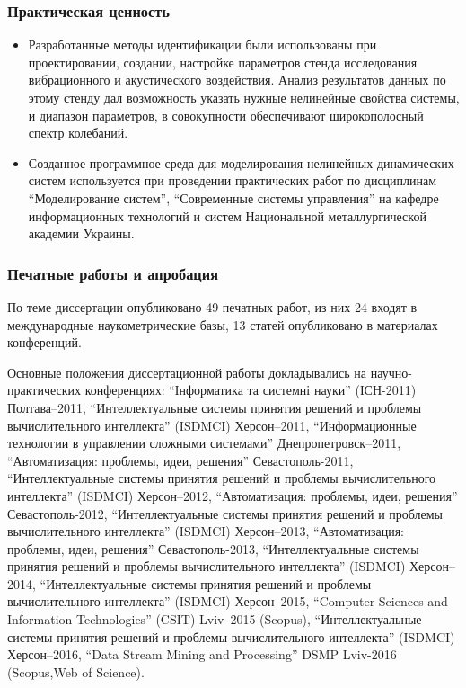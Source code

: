 \documentclass[10pt,utf8]{beamer}
\begin{document}

\begin{frame}
  \frametitle{Практическая ценность}

  \begin{itemize}

    \item
      Разработанные методы идентификации были использованы при проектировании,
      создании, настройке параметров стенда исследования вибрационного и
      акустического воздействия. Анализ результатов данных по этому стенду дал
      возможность указать нужные нелинейные свойства системы, и диапазон параметров,
      в совокупности обеспечивают широкополосный спектр колебаний.

    \item
      Созданное программное среда для моделирования нелинейных динамических систем
      используется при проведении практических работ по дисциплинам
      ``Моделирование систем'', ``Современные системы управления''
      на кафедре информационных технологий
      и систем Национальной металлургической академии Украины.

  \end{itemize}


\end{frame}




\begin{frame}
  \frametitle{Печатные работы и апробация}

По теме диссертации опубликовано
49 печатных работ,
из них
24 входят в международные наукометрические базы,
13 статей опубликовано в материалах конференций.

{\scriptsize
Основные положения диссертационной работы докладывались на
научно-практических конференциях:
``Інформатика та системні науки'' (ІСН-2011) Полтава--2011,
``Интеллектуальные системы принятия решений и проблемы вычислительного интеллекта'' (ISDMCI) Херсон--2011,
``Информационные технологии в управлении сложными системами'' Днепропетровск--2011,
``Автоматизация: проблемы, идеи, решения'' Севастополь-2011,
``Интеллектуальные системы принятия решений и проблемы вычислительного интеллекта'' (ISDMCI) Херсон--2012,
``Автоматизация: проблемы, идеи, решения'' Севастополь-2012,
``Интеллектуальные системы принятия решений и проблемы вычислительного интеллекта'' (ISDMCI) Херсон--2013,
``Автоматизация: проблемы, идеи, решения'' Севастополь-2013,
``Интеллектуальные системы принятия решений и проблемы вычислительного интеллекта'' (ISDMCI) Херсон--2014,
``Интеллектуальные системы принятия решений и проблемы вычислительного интеллекта'' (ISDMCI) Херсон--2015,
``Computer Sciences and Information Technologies'' (CSIT) Lviv--2015 (Scopus),
``Интеллектуальные системы принятия решений и проблемы вычислительного интеллекта'' (ISDMCI) Херсон--2016,
``Data Stream Mining and Processing'' DSMP Lviv-2016 (Scopus,Web of Science).
}

\end{frame}
\end{document}

